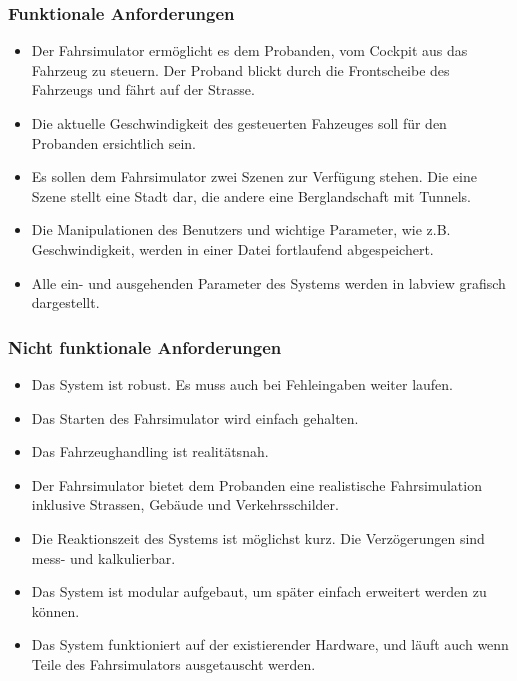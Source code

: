 \subsubsection{Funktionale Anforderungen}
\begin{itemize}
\item Der Fahrsimulator ermöglicht es dem Probanden, vom Cockpit aus das Fahrzeug zu steuern. Der Proband blickt durch die Frontscheibe des Fahrzeugs und fährt auf der Strasse.
\item Die aktuelle Geschwindigkeit des gesteuerten Fahzeuges soll für den Probanden ersichtlich sein. 
\item Es sollen dem Fahrsimulator zwei Szenen zur Verfügung stehen. Die eine Szene stellt eine Stadt dar, die andere eine Berglandschaft mit Tunnels.
\item Die Manipulationen des Benutzers und wichtige Parameter, wie z.B. Geschwindigkeit, werden in einer Datei fortlaufend abgespeichert.
\item Alle ein- und ausgehenden Parameter des Systems werden in \gls{labview} grafisch dargestellt.
\end{itemize}

\subsubsection {Nicht funktionale Anforderungen}
\renewcommand{\labelenumi}{\alph{enumi})}

\begin{itemize}
\item Das System ist robust. Es muss auch bei Fehleingaben weiter laufen. 
\item Das Starten des Fahrsimulator wird einfach gehalten.
\item Das Fahrzeughandling ist realitätsnah.
\item Der Fahrsimulator bietet dem Probanden eine realistische Fahrsimulation inklusive Strassen, Gebäude und Verkehrsschilder. 
\item Die Reaktionszeit des Systems ist möglichst kurz. Die Verzögerungen sind mess- und kalkulierbar.
\item Das System ist modular aufgebaut, um später einfach erweitert werden zu können.
\item Das System funktioniert auf der existierender Hardware, und läuft auch wenn Teile des Fahrsimulators ausgetauscht werden.
\end{itemize}
